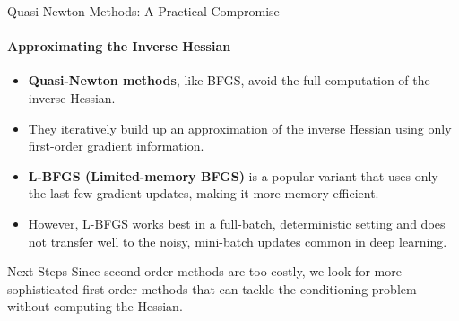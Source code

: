 \begin{frame}{Quasi-Newton Methods: A Practical Compromise}
    \framesubtitle{Approximating the Inverse Hessian}
    \begin{itemize}
        \item \textbf{Quasi-Newton methods}, like BFGS, avoid the full computation of the inverse Hessian.
        \item They iteratively build up an approximation of the inverse Hessian using only first-order gradient information.
        \item \textbf{L-BFGS (Limited-memory BFGS)} is a popular variant that uses only the last few gradient updates, making it more memory-efficient.
        \item However, L-BFGS works best in a full-batch, deterministic setting and does not transfer well to the noisy, mini-batch updates common in deep learning.
    \end{itemize}
    \begin{alertblock}{Next Steps}
        Since second-order methods are too costly, we look for more sophisticated first-order methods that can tackle the conditioning problem without computing the Hessian.
    \end{alertblock}
\end{frame}
